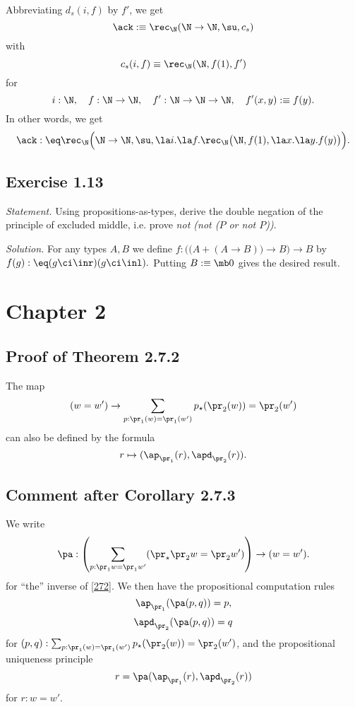 \documentclass[12pt]{article}
\begin{document}
Abbreviating $d_s(i,f)$ by $f'$, we get 
$$
\ack:\equiv\rec_\N(\N\to\N,\su,c_s)
$$ 
with 
$$ 
c_s(i,f)\equiv\rec_\N(\N,f(1),f')
$$ 
for 
$$ 
i:\N,\quad f:\N\to\N,\quad f':\N\to\N\to\N,\quad f'(x,y):\equiv f(y).
$$ 
In other words, we get 
$$
\ack:\eq\rec_\N\Big(\N\to\N,\su,\la i.\la f.\rec_\N\big(\N,f(1),\la x.\la y.f(y)\big)\Big).
$$


\subsection{Exercise 1.13}

\emph{Statement.} Using propositions-as-types, derive the double negation of the principle of excluded middle, i.e. prove \emph{not (not ($P$ or not $P$))}.

\nn\emph{Solution.} For any types $A,B$ we define $f:\Big(\big(A+(A\to B)\big)\to B\Big)\to B$ by $f(g):\eq(g\ci\inr)(g\ci\inl).$ Putting $B:\equiv\mb0$ gives the desired result.


\section{Chapter 2}

\subsection{Proof of Theorem 2.7.2}

The map 
\begin{equation}\label{272}
(w=w')\to\sum_{p:\pr_1(w)=\pr_1(w')}p_\star(\pr_2(w))=\pr_2(w')
\end{equation}
can also be defined by the formula 
$$
r\mapsto(\ap_{\pr_1}(r),\apd_{\pr_2}(r)).
$$ 


\subsection{Comment after Corollary 2.7.3}

We write 
$$
\pa:\left(\sum_{p:\pr_1w=\pr_1w'}(\pr_\star\pr_2w=\pr_2w')\right)\to(w=w').
$$ 
for ``the'' inverse of \eqref{272}. We then have the propositional computation rules 
$$
\ap_{\pr_1}(\pa(p,q))=p,
$$
$$
\apd_{\pr_2}(\pa(p,q))=q
$$
for $(p,q):\sum_{p:\pr_1(w)=\pr_1(w')}p_\star(\pr_2(w))=\pr_2(w')$, and the propositional uniqueness principle 
$$
r=\pa(\ap_{\pr_1}(r),\apd_{\pr_2}(r))
$$ 
for $r:w=w'$.
\end{document}
